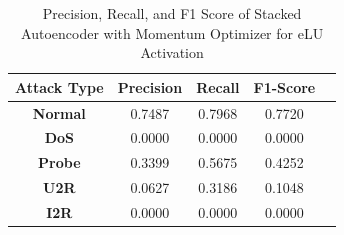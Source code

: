 \documentclass[12pt, a4paper]{report}
\begin{document}
\begin{table}[ht]
\centering
\captionsetup{justification=centering,margin=2cm}
\begin{tabular}{|c|c|c|c|c|}
\hline
\multicolumn{1}{|c|}{\textbf{Attack Type}} & \multicolumn{1}{c|}{\textbf{Precision}} & \multicolumn{1}{c|}{\textbf{Recall}} & \multicolumn{1}{c|}{\textbf{F1-Score}} \\ \hline
\textbf{Normal}        & 0.7487                                   & 0.7968                                & 0.7720                                                                  \\ \hline
\textbf{DoS}           & 0.0000                                  & 0.0000                                &  0.0000                                                                    \\ \hline
\textbf{Probe}         & 0.3399                                  & 0.5675                                & 0.4252                                                                  \\ \hline
\textbf{U2R}           & 0.0627                                    & 0.3186                                & 0.1048                                                                   \\ \hline
\textbf{I2R}           & 0.0000                                      & 0.0000                                   & 0.0000                                                            \\ \hline         \end{tabular}
\caption{Precision, Recall, and F1 Score of Stacked Autoencoder with Momentum Optimizer for eLU Activation}
\label{prf1_mom_elu_auto}
\end{table}
\clearpage
\end{document}
